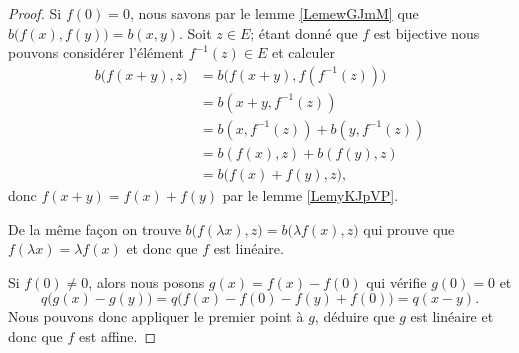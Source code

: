\begin{proof}
    Si \( f(0)=0\), nous savons par le lemme \ref{LemewGJmM} que \( b\big( f(x),f(y) \big)=b(x,y)\). Soit \( z\in E\); étant donné que \( f\) est bijective nous pouvons considérer l'élément \( f^{-1}(z)\in E\) et calculer
    \begin{subequations}
        \begin{align}
            b\big( f(x+y),z \big)&=b\big( f(x+y),f(f^{-1}(z)) \big)\\
            &=b(x+y,f^{-1}(z))\\
            &=b(x,f^{-1}(z))+b(y,f^{-1}(z))\\
            &=b(f(x),z)+b(f(y),z)\\
            &=b\big( f(x)+f(y),z \big),
        \end{align}
    \end{subequations}
    donc \( f(x+y)=f(x)+f(y)\) par le lemme \ref{LemyKJpVP}. 

    De la même façon on trouve \( b\big( f(\lambda x),z \big)=b\big( \lambda f(x),z \big)\) qui prouve que \( f(\lambda x)=\lambda f(x)\) et donc que \( f\) est linéaire.

    Si \( f(0)\neq 0\), alors nous posons \( g(x)=f(x)-f(0)\) qui vérifie \( g(0)=0\) et
    \begin{equation}
        q\big( g(x)-g(y) \big)=q\big( f(x)-f(0)-f(y)+f(0) \big)=q(x-y).
    \end{equation}
    Nous pouvons donc appliquer le premier point à \( g\), déduire que \( g\) est linéaire et donc que \( f\) est affine.
\end{proof}

{}

